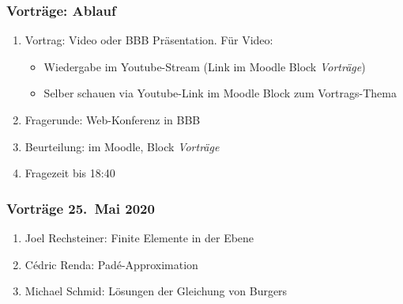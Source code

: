 %
%
%


\begin{frame}
\frametitle{Vorträge: Ablauf}
\begin{enumerate}
\item<2-> Vortrag: Video oder BBB Präsentation. Für Video:
\begin{itemize}
\item<3-> Wiedergabe im Youtube-Stream  (Link im Moodle Block {\em Vorträge})
\item<4-> Selber schauen via Youtube-Link im Moodle Block zum Vortrags-Thema
\end{itemize}
\item<5-> Fragerunde: Web-Konferenz in BBB
\item<6-> Beurteilung: im Moodle, Block {\em Vorträge}
\bigskip
\item<7-> Fragezeit bis 18:40
\end{enumerate}
\end{frame}

\begin{frame}
\frametitle{Vorträge 25.~Mai 2020}
\begin{enumerate}
\item<2->
Joel Rechsteiner: Finite Elemente in der Ebene
\bigskip

\item<3->
Cédric Renda: Padé-Approximation
\bigskip

\item<4->
Michael Schmid: Lösungen der Gleichung von Burgers

\end{enumerate}
\end{frame}


